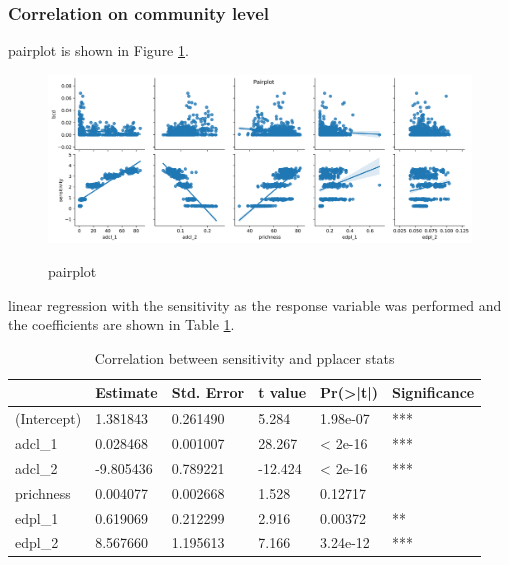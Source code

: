 \documentclass{article}
\begin{document}
\subsubsection{Correlation on community level}
pairplot is shown in Figure \ref{pairplot-communitylevel}.\par
\begin{figure}[H]
	\centering
	\includegraphics[width=\textwidth, keepaspectratio]{pairplot-community.png}\\
	\caption{pairplot}
	\label{pairplot-communitylevel}
\end{figure}
linear regression with the sensitivity as the response variable was performed and the coefficients are shown in Table \ref{Tab:corresensitivity}. \par
\begin{table}[ht]
\caption{Correlation between sensitivity and pplacer stats}
\begin{tabular}{llllll}
\hline
            & Estimate &Std. Error &t value &Pr(>|t|) & Significance    \\
            \hline
(Intercept) & 1.381843 &  0.261490 &  5.284 &1.98e-07 &*** \\
adcl_1      & 0.028468 &  0.001007 & 28.267 & < 2e-16 &*** \\
adcl_2      &-9.805436 &  0.789221 &-12.424 & < 2e-16 &*** \\
prichness   & 0.004077 &  0.002668 &  1.528 & 0.12717 &    \\
edpl_1      & 0.619069 &  0.212299 &  2.916 & 0.00372 &**  \\
edpl_2      & 8.567660 &  1.195613 &  7.166 &3.24e-12 &*** \\
\hline
\end{tabular}
\label{Tab:corresensitivity}
\end{table}
\end{document}

